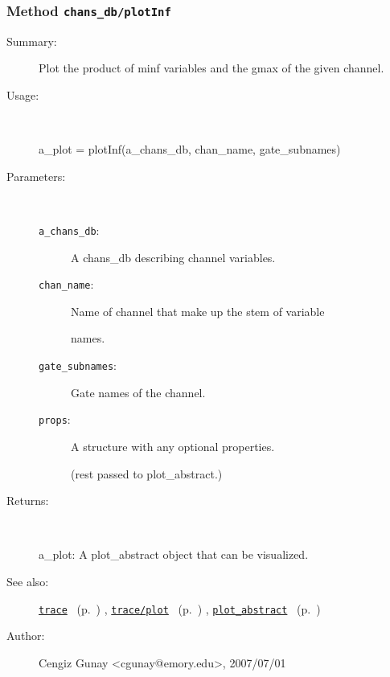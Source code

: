 \subsubsection[Method \texttt{plotInf}]{Method \texttt{chans\_db/plotInf}}%
%
\label{ref_chans_db__plotInf}%
\hypertarget{ref_chans_db__plotInf}{}%
\begin{description}
\item[Summary:]Plot the product of minf variables and the gmax of the given channel.
%
\item[Usage:]~%
\begin{lyxcode}%
a\_plot = plotInf(a\_chans\_db, chan\_name, gate\_subnames)
%
\end{lyxcode}%
%
%
\item[Parameters:]~
\begin{description}%
\item[\texttt{a\_chans\_db}:]
 A chans\_db describing channel variables.
\item[\texttt{chan\_name}:]
 Name of channel that make up the stem of variable

names.\item[\texttt{gate\_subnames}:]
 Gate names of the channel.
\item[\texttt{props}:]
 A structure with any optional properties.

(rest passed to plot\_abstract.)\end{description}%
%
\item[Returns:]~

	a\_plot: A plot\_abstract object that can be visualized.
%
%
\item[See also:]%
\hyperlink{ref_trace}{\texttt{trace}}%
\ (p.~\pageref{ref_trace})%
%
, \hyperlink{ref_trace__plot}{\texttt{trace/plot}}%
\ (p.~\pageref{ref_trace__plot})%
%
, \hyperlink{ref_plot_abstract}{\texttt{plot\_abstract}}%
\ (p.~\pageref{ref_plot_abstract})%
%
%
\item[Author:]%
Cengiz Gunay <cgunay@emory.edu>, 2007/07/01%
\end{description}
\methodline%

